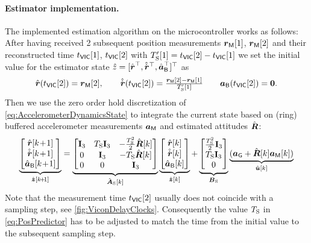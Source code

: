 \paragraph{Estimator implementation.}
The implemented estimation algorithm on the microcontroller works as follows:
After having received 2 subsequent position measurements $\boldsymbol{r}_{\mathsf{M}}[1]$, $\boldsymbol{r}_{\mathsf{M}}[2]$ and their reconstructed time $t_{\mathsf{VIC}}[1]$, $t_{\mathsf{VIC}}[2]$ with $T_{\mathrm{S}}'[1]=t_{\mathsf{VIC}}[2]-t_{\mathsf{VIC}}[1]$ we set the initial value for the estimator state $\hat{z} = [\hat{\boldsymbol{r}}^\top, \hat{\dot{\boldsymbol{r}}}^\top, \hat{\boldsymbol{a}}_{\mathsf{B}}^\top]^\top$ as
\begin{align}
 \hat{\boldsymbol{r}}(t_{\mathsf{VIC}}[2]) = \boldsymbol{r}_{\mathsf{M}}[2], 
\qquad
 \hat{\dot{\boldsymbol{r}}}(t_{\mathsf{VIC}}[2]) = \tfrac{\boldsymbol{r}_{\mathsf{M}}[2]-\boldsymbol{r}_{\mathsf{M}}[1]}{T_{\mathrm{S}}'[1]}
\qquad
 \boldsymbol{a}_{\mathsf{B}}(t_{\mathsf{VIC}}[2]) = \boldsymbol{0}.
\end{align}
Then we use the zero order hold discretization of \eqref{eq:AccelerometerDynamicsState} to integrate the current state based on (ring) buffered accelerometer measurements $\boldsymbol{a}_{\mathsf{M}}$ and estimated attitudes $\hat{\boldsymbol{R}}$:
\begin{align}\label{eq:PosPredictor}
 \underbrace{\begin{bmatrix} \rObs[\kPlusOne] \\ \rdObs[\kPlusOne] \\ \aIMUBObs[\kPlusOne] \end{bmatrix}}_{\hat{\tuple{z}}[\kPlusOne]}
 =
 \underbrace{\begin{bmatrix} \idMat[3] & \Ts\idMat[3] & -\tfrac{\Ts^2}{2}\RObs[k] \\ 0 & \idMat[3] & -\Ts\RObs[k] \\ 0 & 0 & \idMat[3] \end{bmatrix}}_{\hat{\mat{A}}_\idxSamp[k]}
 \underbrace{\begin{bmatrix} \rObs[k] \\ \rdObs[k] \\ \aIMUBObs[k] \end{bmatrix}}_{\hat{\tuple{z}}[k]}
 +
 \underbrace{\begin{bmatrix} \tfrac{\Ts^2}{2}\idMat[3] \\ \Ts \idMat[3] \\ 0 \end{bmatrix}}_{\mat{B}_\idxSamp}
 \underbrace{(\gravityAcc + \RObs[k] \aIMU[k])}_{\hat{\tuple{u}}[k]}
\end{align}
Note that the measurement time $t_{\mathsf{VIC}}[2]$ usually does not coincide with a sampling step, see \autoref{fig:ViconDelayClocks}.
Consequently the value $T_{\mathrm{S}}$ in \eqref{eq:PosPredictor} has to be adjusted to match the time from the initial value to the subsequent sampling step.

